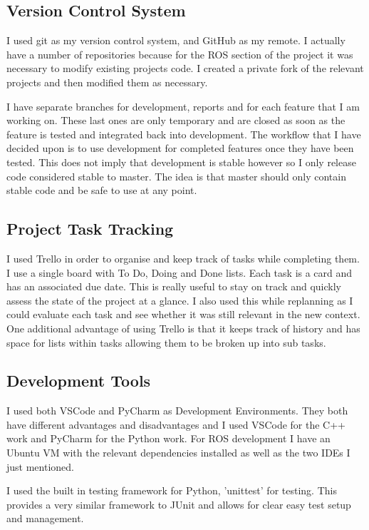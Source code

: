 \documentclass[]{../resources/final_report}
\begin{document}
\subsection{Version Control System}
I used git as my version control system, and GitHub as my remote. I actually have a number of 
repositories because for the ROS section of the project it was necessary to modify existing 
projects code. I created a private fork of the relevant projects and then modified them as necessary.

I have separate branches for development, reports and for each feature that I am working on. 
These last ones are only temporary and are closed as soon as the feature is tested and integrated 
back into development. The workflow that I have decided upon is to use development for completed 
features once they have been tested. This does not imply that development is stable however so I 
only release code considered stable to master. The idea is that master should only contain stable 
code and be safe to use at any point.

\subsection{Project Task Tracking}
I used Trello in order to organise and keep track of tasks while completing them. I use a single 
board with To Do, Doing and Done lists. Each task is a card and has an associated due date.
This is really useful to stay on track and quickly assess the state of the project at a glance. 
I also used this while replanning as I could evaluate each task and see whether it was still 
relevant in the new context. One additional advantage of using Trello is that it keeps track of 
history and has space for lists within tasks allowing them to be broken up into sub tasks.


\subsection{Development Tools}

I used both VSCode and PyCharm as Development Environments. They both have different advantages 
and disadvantages and I used VSCode for the C++ work and PyCharm for the Python work.
For ROS development I have an Ubuntu VM with the relevant dependencies installed as well as the 
two IDEs I just mentioned.

I used the built in testing framework for Python, 'unittest' for testing. This provides a very 
similar framework to JUnit and allows for clear easy test setup and management.
\end{document}
